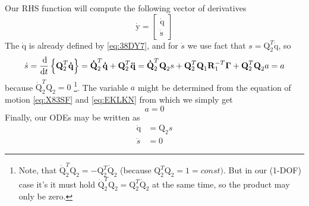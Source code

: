 \documentclass{scrartcl}
\newcommand\mMat[1]{\ensuremath{\boldsymbol{\mathrm{#1}}}}
\newcommand\mVec[1]{\ensuremath{\boldsymbol{\mathrm{#1}}}}
\begin{document}
Our RHS function will compute the following vector of derivatives
\begin{equation}
  \mVec{\dot y} = \begin{bmatrix}
    \mVec{\dot q} \\
    \mVec{\dot s}
  \end{bmatrix}
\end{equation}
The $\mVec{\dot q}$ is already defined by \eqref{eq:38DY7}, and for ${\dot s}$
we use fact that $s = \mMat{Q}_2^T \mVec{\dot q}$, so
\begin{equation}
  {\dot s} =  \frac{\dif}{\dif t}\left\{\mMat{Q}_2^T\mVec{\dot q}\right\}
  = \mMat{\dot Q}_2^T \mVec{\dot q}
  + \mMat{Q}_2^T \mVec{\ddot q}
  = \mMat{\dot Q}_2^T \mVec{Q}_2 s
  + \mMat{Q}_2^T \mMat{Q}_1 \mMat{R}_1^{-T} \mVec{\Gamma}
  + \mMat{Q}_2^T \mMat{Q}_2 a
  = a
\end{equation}
because $\mMat{\dot Q}_2^T\mMat{Q}_2 = 0$ \footnote{Note, that
$\mMat{\dot Q}_2^T\mMat{Q}_2 = - \mMat{Q}_2^T \mMat{\dot Q}_2$ (because
$\mMat{Q}_2^T\mMat{Q}_2 = 1 = const)$. But in our (1-DOF) case it's it must
hold $\mMat{\dot Q}_2^T\mMat{Q}_2 = \mMat{Q}_2^T\mMat{\dot Q}_2$ at the same
time, so the product may only be zero.}.
The variable $a$ might be determined from the equation of motion
\eqref{eq:X83SF} and \eqref{eq:EKLKN} from which we simply get
\begin{equation}
  a = 0
\end{equation}
Finally, our ODEs may be written as
\begin{subequations}
  \begin{align}
    \mVec{\dot q} &= \mMat{Q}_2 s
    \\
    {\dot s} &= 0
  \end{align}
\end{subequations}
\end{document}
